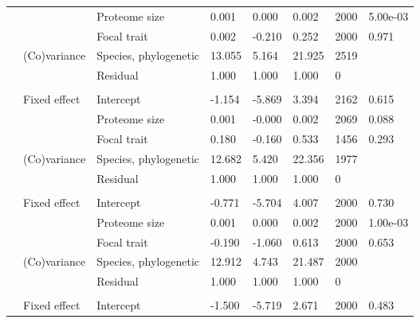 \begin{table}
\begin{tabular}[t]{llllllll}
\hspace{1em} &  & Proteome size & 0.001 & 0.000 & 0.002 & 2000 & 5.00e-03\\
\hspace{1em} &  & Focal trait & 0.002 & -0.210 & 0.252 & 2000 & 0.971\\
\hspace{1em} & (Co)variance & Species, phylogenetic & 13.055 & 5.164 & 21.925 & 2519 & \\
\hspace{1em} &  & Residual & 1.000 & 1.000 & 1.000 & 0 \vphantom{5} & \\
\addlinespace[0.3em]
\multicolumn{8}{l}{\textbf{Antibiotic degradation}}\\
\hspace{1em} & Fixed effect & Intercept & -1.154 & -5.869 & 3.394 & 2162 & 0.615\\
\hspace{1em} &  & Proteome size & 0.001 & -0.000 & 0.002 & 2069 & 0.088\\
\hspace{1em} &  & Focal trait & 0.180 & -0.160 & 0.533 & 1456 & 0.293\\
\hspace{1em} & (Co)variance & Species, phylogenetic & 12.682 & 5.420 & 22.356 & 1977 & \\
\hspace{1em} &  & Residual & 1.000 & 1.000 & 1.000 & 0 \vphantom{4} & \\
\addlinespace[0.3em]
\multicolumn{8}{l}{\textbf{Quorum sensing}}\\
\hspace{1em} & Fixed effect & Intercept & -0.771 & -5.704 & 4.007 & 2000 & 0.730\\
\hspace{1em} &  & Proteome size & 0.001 & 0.000 & 0.002 & 2000 & 1.00e-03\\
\hspace{1em} &  & Focal trait & -0.190 & -1.060 & 0.613 & 2000 & 0.653\\
\hspace{1em} & (Co)variance & Species, phylogenetic & 12.912 & 4.743 & 21.487 & 2000 & \\
\hspace{1em} &  & Residual & 1.000 & 1.000 & 1.000 & 0 \vphantom{3} & \\
\addlinespace[0.3em]
\multicolumn{8}{l}{\textbf{Secretion systems}}\\
\hspace{1em} & Fixed effect & Intercept & -1.500 & -5.719 & 2.671 & 2000 & 0.483\\

\end{tabular}
\end{table}
